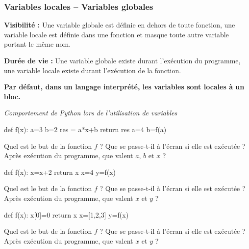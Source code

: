 \documentclass[10pt]{article}
\begin{document}
\subsubsection{Variables locales -- Variables globales}
\begin{defi}
\textbf{Visibilité :} Une variable globale est définie en dehors de toute fonction, une variable locale est définie dans une fonction et masque toute autre variable portant le même nom.

\textbf{Durée de vie :} Une variable globale existe durant l'exécution du programme, une variable locale existe durant l'exécution de la fonction.

\textbf{Par défaut, dans un langage interprété, les variables sont locales à un bloc.}
\end{defi}


\begin{exemple}

\textit{Comportement de Python lors de l'utilisation de variables}

\begin{minipage}[t]{.2\linewidth}
\begin{py}
\begin{python}
def f(x):
    a=3
    b=2
    res = a*x+b
    return res
a=4
b=f(a)
\end{python}
\end{py}
\end{minipage} \hfill
\begin{minipage}[t]{.78\linewidth}
Quel est le but de la fonction $f$ ? Que se passe-t-il à l'écran si elle est exécutée ? Après exécution du programme, que valent $a$, $b$ et $x$ ?
\end{minipage}

\vspace{2cm}

\begin{minipage}[t]{.2\linewidth}
\begin{py}
\begin{python}
def f(x):
    x=x+2
    return x
x=4
y=f(x)
\end{python}
\end{py}
\end{minipage} \hfill
\begin{minipage}[t]{.78\linewidth}
Quel est le but de la fonction $f$ ? Que se passe-t-il à l'écran si elle est exécutée ? Après exécution du programme, que valent $x$ et $y$ ?
\end{minipage}

\begin{minipage}[t]{.2\linewidth}
\begin{py}
\begin{python}
def f(x):
    x[0]=0
    return x
x=[1,2,3]
y=f(x)
\end{python}
\end{py}
\end{minipage} \hfill
\begin{minipage}[t]{.78\linewidth}
Quel est le but de la fonction $f$ ? Que se passe-t-il à l'écran si elle est exécutée ? Après exécution du programme, que valent $x$ et $y$ ?
\end{minipage}

\end{exemple}
\end{document}
